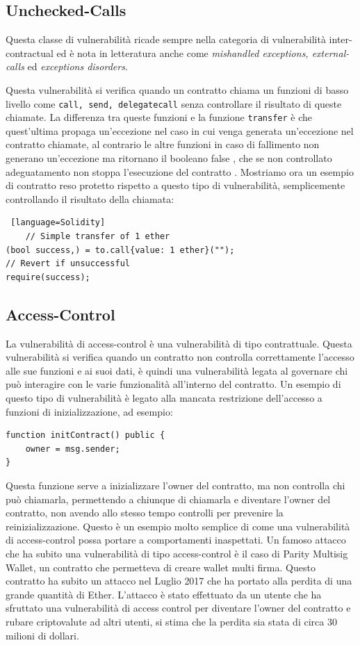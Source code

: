 \documentclass[../../Thesis.tex]{subfiles}
\begin{document}
\subsection{Unchecked-Calls}
Questa classe di vulnerabilità ricade sempre nella categoria di vulnerabilità inter-contractual ed è nota in letteratura anche come \emph{mishandled exceptions, external-calls} ed \emph{exceptions disorders}. 

Questa vulnerabilità si verifica quando un contratto chiama un funzioni di basso livello come \texttt{call, send, delegatecall} senza controllare il risultato di queste chiamate. La differenza tra queste funzioni e la funzione \texttt{transfer} è che quest'ultima propaga un'eccezione nel caso in cui venga generata un'eccezione nel contratto chiamate, al contrario le altre funzioni in caso di fallimento non generano un'eccezione ma ritornano il booleano false \cite{SurveySC}, che se non controllato adeguatamento non stoppa l'esecuzione del contratto \cite{careSC}.  Mostriamo ora un esempio di contratto reso protetto rispetto a questo tipo di vulnerabilità, semplicemente controllando il risultato della chiamata:
\begin{lstlisting} [language=Solidity]
    // Simple transfer of 1 ether
(bool success,) = to.call{value: 1 ether}("");
// Revert if unsuccessful
require(success);
\end{lstlisting}


\subsection{Access-Control}
La vulnerabilità di access-control è una vulnerabilità di tipo contrattuale. Questa vulnerabilità si verifica quando un contratto non controlla correttamente l'accesso alle sue funzioni e ai suoi dati, è quindi una vulnerabilità legata al governare chi può interagire con le varie funzionalità all'interno del contratto. Un esempio di questo tipo di vulnerabilità è legato alla mancata restrizione dell'accesso a funzioni di inizializzazione, ad esempio:
\begin{lstlisting}[language=Solidity]
function initContract() public {
    owner = msg.sender;
}
\end{lstlisting} 
Questa funzione serve a inizializzare l'owner del contratto, ma non controlla chi può chiamarla, permettendo a chiunque di chiamarla e diventare l'owner del contratto, non avendo allo stesso tempo controlli per prevenire la reinizializzazione. Questo è un esempio molto semplice di come una vulnerabilità di access-control possa portare a comportamenti inaspettati. 
Un famoso attacco che ha subito una vulnerabilità di tipo access-control è il caso di Parity Multisig Wallet, un contratto che permetteva di creare wallet multi firma. Questo contratto ha subito un attacco nel Luglio 2017 che ha portato alla perdita di una grande quantità di Ether. L'attacco è stato effettuato da un utente che ha sfruttato una vulnerabilità di access control per diventare l'owner del contratto e rubare criptovalute ad altri utenti, si stima che la perdita sia stata di circa 30 milioni di dollari.
\end{document}
